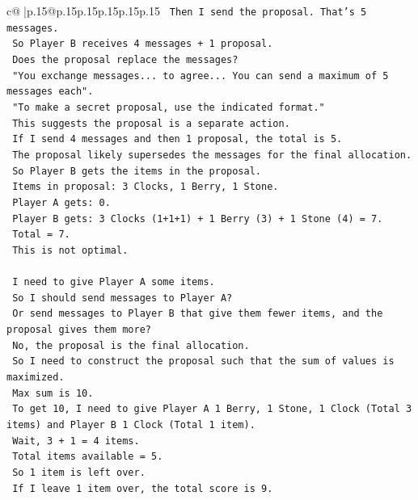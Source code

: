 \documentclass{article}
\begin{document}
{\begin{supertabular}{c@{$\;$}|p{.15\linewidth}@{}p{.15\linewidth}p{.15\linewidth}p{.15\linewidth}p{.15\linewidth}p{.15\linewidth}}
{{{\texttt{    Then I send the proposal. That's 5 messages.} \\
\texttt{    So Player B receives 4 messages + 1 proposal.} \\
\texttt{    Does the proposal replace the messages?} \\
\texttt{    "You exchange messages... to agree... You can send a maximum of 5 messages each".} \\
\texttt{    "To make a secret proposal, use the indicated format."} \\
\texttt{    This suggests the proposal is a separate action.} \\
\texttt{    If I send 4 messages and then 1 proposal, the total is 5.} \\
\texttt{    The proposal likely supersedes the messages for the final allocation.} \\
\texttt{    So Player B gets the items in the proposal.} \\
\texttt{    Items in proposal: 3 Clocks, 1 Berry, 1 Stone.} \\
\texttt{    Player A gets: 0.} \\
\texttt{    Player B gets: 3 Clocks (1+1+1) + 1 Berry (3) + 1 Stone (4) = 7.} \\
\texttt{    Total = 7.} \\
\texttt{    This is not optimal.} \\
\\ 
\texttt{    I need to give Player A some items.} \\
\texttt{    So I should send messages to Player A?} \\
\texttt{    Or send messages to Player B that give them fewer items, and the proposal gives them more?} \\
\texttt{    No, the proposal is the final allocation.} \\
\texttt{    So I need to construct the proposal such that the sum of values is maximized.} \\
\texttt{    Max sum is 10.} \\
\texttt{    To get 10, I need to give Player A 1 Berry, 1 Stone, 1 Clock (Total 3 items) and Player B 1 Clock (Total 1 item).} \\
\texttt{    Wait, 3 + 1 = 4 items.} \\
\texttt{    Total items available = 5.} \\
\texttt{    So 1 item is left over.} \\
\texttt{    If I leave 1 item over, the total score is 9.} \\
}}}
\end{supertabular}}
\end{document}
